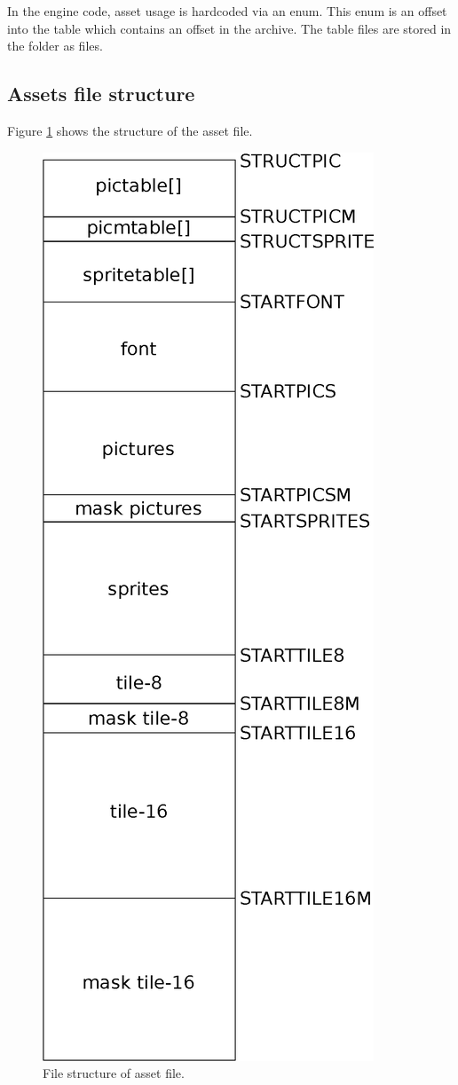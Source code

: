 \documentclass[book.tex]{subfiles}
\begin{document}
 In the engine code, asset usage is hardcoded via an enum. This enum is an offset into the  table which contains an offset in the  archive. The  table files are stored in the  folder as  files.\\

\subsection{Assets file structure}
\label{section:asset_file_structure}
Figure \ref{fig:asset-file} shows the structure of the  asset file.
\begin{figure}[H]
\centering
 \includegraphics[width=.5\textwidth]{imgs/drawings/graphic_assets.eps}
 \caption{File structure of  asset file.}
 \label{fig:asset-file}
\end{figure}
\end{document}
